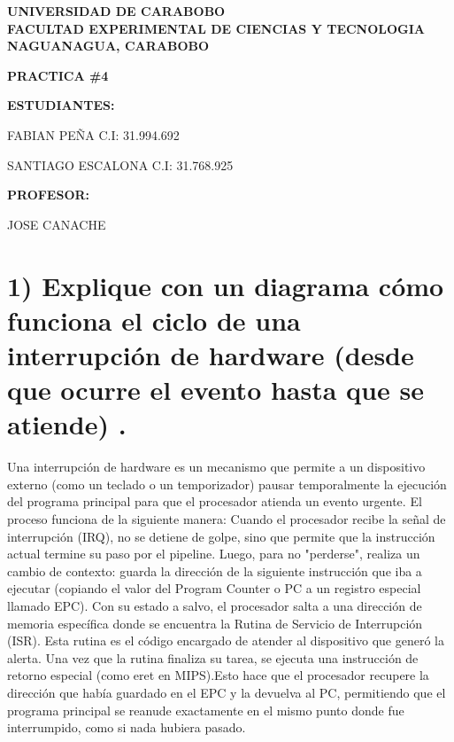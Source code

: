 \documentclass[12pt]{article}
\begin{document}
\begin{center}
\textbf{UNIVERSIDAD DE CARABOBO}\\
\vspace{0.3cm}
\textbf{FACULTAD EXPERIMENTAL DE CIENCIAS Y TECNOLOGIA}\\
\vspace{0.3cm}
\textbf{NAGUANAGUA, CARABOBO}
\end{center}

\vspace{1.5cm}


\vspace{2cm}

\begin{center}
\textbf{PRACTICA \#4}
\end{center}

\vspace{2cm}

\noindent
\textbf{ESTUDIANTES:}

\vspace{0.5cm}

\noindent
FABIAN PEÑA C.I: 31.994.692

\noindent
SANTIAGO ESCALONA C.I: 31.768.925

\vspace{1.5cm}

\noindent
\textbf{PROFESOR:}

\vspace{0.5cm}

\noindent
JOSE CANACHE

\vspace{2cm}
\vspace{2cm}
\vspace{2cm}


\section*{1) Explique con un diagrama cómo funciona el ciclo de una interrupción de hardware (desde que ocurre el evento hasta que se atiende) .} 

Una interrupción de hardware es un mecanismo que permite a un dispositivo externo (como un teclado o un temporizador) pausar temporalmente la ejecución del programa principal para que el procesador atienda un evento urgente.  El proceso funciona de la siguiente manera: Cuando el procesador recibe la señal de interrupción (IRQ), no se detiene de golpe, sino que permite que la instrucción actual termine su paso por el pipeline.  Luego, para no "perderse", realiza un cambio de contexto: guarda la dirección de la siguiente instrucción que iba a ejecutar (copiando el valor del Program Counter o PC a un registro especial llamado EPC).  Con su estado a salvo, el procesador salta a una dirección de memoria específica donde se encuentra la Rutina de Servicio de Interrupción (ISR). Esta rutina es el código encargado de atender al dispositivo que generó la alerta.  Una vez que la rutina finaliza su tarea, se ejecuta una instrucción de retorno especial (como eret en MIPS).Esto hace que el procesador recupere la dirección que había guardado en el EPC y la devuelva al PC, permitiendo que el programa principal se reanude exactamente en el mismo punto donde fue interrumpido, como si nada hubiera pasado.
\end{document}
